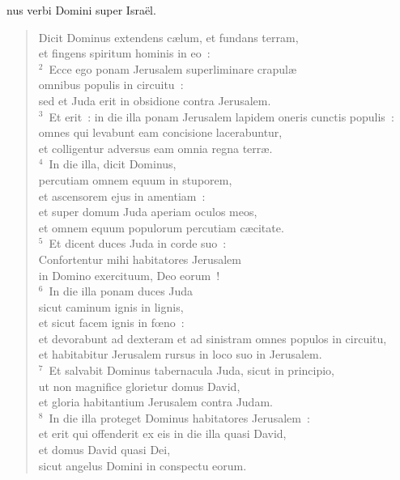 \bchapter
{}nus verbi Domini super Isra\"el. \begin{flushleft}\begin{verse}\vspace{6pt}Dicit Dominus extendens c\ae lum, et fundans terram,\\ et fingens spiritum hominis in eo~:\\
${}^{2}$~Ecce ego ponam Jerusalem superliminare crapul\ae \\ omnibus populis in circuitu~:\\ sed et Juda erit in obsidione contra Jerusalem.\\
${}^{3}$~Et erit~: in die illa ponam Jerusalem lapidem oneris cunctis populis~:\\ omnes qui levabunt eam concisione lacerabuntur,\\ et colligentur adversus eam omnia regna terr\ae .\\
${}^{4}$~In die illa, dicit Dominus,\\ percutiam omnem equum in stuporem,\\ et ascensorem ejus in amentiam~:\\ et super domum Juda aperiam oculos meos,\\ et omnem equum populorum percutiam c\ae citate.\\
${}^{5}$~Et dicent duces Juda in corde suo~:\\ Confortentur mihi habitatores Jerusalem\\ in Domino exercituum, Deo eorum~!\\
${}^{6}$~In die illa ponam duces Juda\\ sicut caminum ignis in lignis,\\ et sicut facem ignis in fœno~:\\ et devorabunt ad dexteram et ad sinistram omnes populos in circuitu,\\ et habitabitur Jerusalem rursus in loco suo in Jerusalem.\\
${}^{7}$~Et salvabit Dominus tabernacula Juda, sicut in principio,\\ ut non magnifice glorietur domus David,\\ et gloria habitantium Jerusalem contra Judam.\\
${}^{8}$~In die illa proteget Dominus habitatores Jerusalem~:\\ et erit qui offenderit ex eis in die illa quasi David,\\ et domus David quasi Dei,\\ sicut angelus Domini in conspectu eorum.\end{verse}\end{flushleft}



